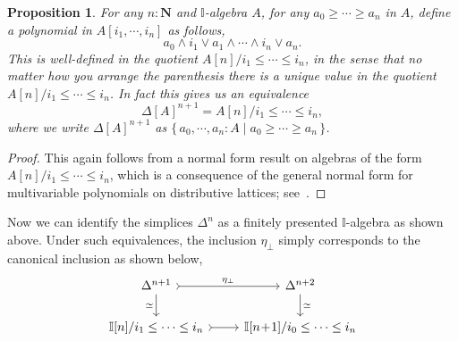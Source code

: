 \documentclass[12pt]{amsart}
\newtheorem{lemma}[theorem]{Lemma}
\newtheorem{proposition}[theorem]{Proposition}
\theoremstyle{definition}
\newcommand{\mb}[1]{\mathbf{#1}}
\newcommand{\mbb}[1]{\mathbb{#1}}
\newcommand{\I}{\mbb I}
\newcommand{\scomp}[2]{\{\,#1\mid#2\,\}}
\newcommand{\N}{\mb N}
\newcommand{\prt}{_{\bot}}
\newcommand{\cprt}{_{\top}}
\begin{document}
\begin{proposition}\label{prop:simplicesasalgebra}
  For any $n : \N$ and $\I$-algebra $A$, for any $a_0 \ge \cdots \ge a_n$ in $A$, define a polynomial in $A[i_1,\cdots,i_n]$ as follows,
  \[ a_0 \wedge i_1 \vee a_1 \wedge \cdots \wedge i_n \vee a_n. \]
  This is well-defined in the quotient $A[n]/i_1 \le \cdots \le i_n$, in the sense that no matter how you arrange the parenthesis there is a unique value in the quotient $A[n]/i_1 \le \cdots \le i_n$. In fact this gives us an equivalence
  \[ \Delta[A]^{n+1} = A[n]/i_1 \le \cdots \le i_n, \]
  where we write $\Delta[A]^{n+1}$ as $\scomp{a_0,\cdots,a_n : A}{a_0 \ge \cdots \ge a_n}$.
\end{proposition}
\begin{proof}
  This again follows from a normal form result on algebras of the form $A[n]/i_1 \le \cdots \le i_n$, which is a consequence of the general normal form for multivariable polynomials on distributive lattices; see~\cite[Thm. 10.21]{lausch2000algebra}.
\end{proof}

Now we can identify the simplices $\Delta^n$ as a finitely presented $\I$-algebra as shown above. Under such equivalences, the inclusion $\eta\prt$ simply corresponds to the canonical inclusion as shown below,
\[
  \begin{tikzcd}
    \Delta^{n+1} \ar[r, tail, "\eta\prt"] \ar[d, "\simeq"'] & \Delta^{n+2}  \ar[d, "\simeq"] \\ 
    \I[n]/i_1 \le \cdots \le i_n \ar[r, tail] & \I[n\!+\!1]/i_0 \le \cdots \le i_{n} 
  \end{tikzcd}
\]




\end{document}
